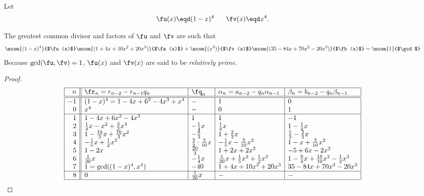 \begin{example}
\label{ex:eea_n=4}
Let
  \[ \fu(x)\eqd (1-x)^4  \hspace{4ex} \fv(x)\eqd x^4. \]

The greatest common divisor and factors of $\fu$ and $\fv$ are such that
\[ \mcom{(1-x)^4}{$\fu(x)$} \mcom{(1 + 4x + 10x^2 + 20x^3)}{$\fa(x)$}   +
   \mcom{(x^4)  }{$\fv(x)$} \mcom{(35 -84x + 70x^2 -20x^3)}{$\fb(x)$} =
   \mcom{1}{$\gcd$}
\]
Because $\gcd(\fu,\fv)=1$, $\fu(x)$ and $\fv(x)$ are said to be
{\em relatively prime}.
\end{example}
\begin{proof}
\[\begin{array}{|r||l|l|l|l|}
  \hline
  n  & \fr_n=r_{n-2}-r_{n-1}q_n  & \fq_n   & \alpha_n=a_{n-2}-q_n \alpha_{n-1} & \beta_n=b_{n-2}-q_n \beta_{n-1}  \\
  \hline
  \hline
  -1  & (1-x)^4=1-4x+6^2-4x^3+x^4
      & -
      & 1
      & 0
      \\
   0  & x^4
      & -
      & 0
      & 1
      \\
  \hline
   1  & 1-4x+6x^2-4x^3
      &  1
      &  1
      & -1
      \\
   2  & \frac{1}{4}x - x^2 +\frac{3}{2}x^3
      & -\frac{1}{4}x
      & \frac{1}{4}x
      & 1-\frac{1}{4}x
      \\
   3  & 1 - \frac{10}{3}x + \frac{10}{3}x^2
      & -         \frac{8}{3}
      & 1 + \frac{2}{3}x
      & \frac{5}{3} - \frac{2}{3}x
      \\
   4  & -\frac{1}{5}x + \frac{1}{2}x^2
      & \frac{3}{2}\cdot\frac{3}{10}x
      & -\frac{1}{5}x - \frac{3}{10}x^2
      & 1 - x + \frac{3}{10}x^2
      \\
   5  & 1 - 2x
      & \frac{20}{3}
      & 1 + 2x + 2x^2
      &  -5 + 6x - 2x^2
      \\
   6  & \frac{1}{20}x
      & -\frac{1}{4}x
      & \frac{1}{20}x + \frac{1}{5}x^2  + \frac{1}{2}x^3
      & 1 -\frac{9}{4}x + \frac{18}{10}x^2 - \frac{1}{2}x^3
      \\
   7  & 1 = \gcd((1-x)^4,x^4)
      & -40
      & 1 + 4x + 10x^2 + 20x^3
      & 35 -84x + 70x^2 -20x^3
      \\
  \hline
   8  & 0
      & \frac{1}{20}x
      & -
      & -
      \\
  \hline
\end{array}\]
\end{proof}

